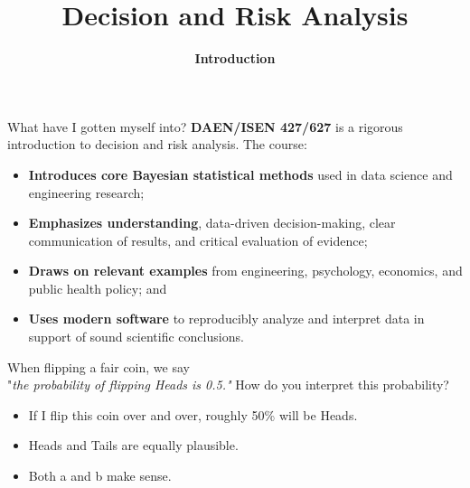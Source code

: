 \documentclass[12pt]{beamer}
\title{Decision and Risk Analysis}
\subtitle{\textbf{Introduction}}
\author{}
\date{
\color{aggiemaroon}{
DAEN 427 / ISEN 427 / ISEN 627 - Fall 2026\\
\textbf{Alexander Abuabara}
}
}
\newcommand{\vocab}[1]{\textcolor{AggieMaroon}{\textbf{#1}}}
\begin{document}
\maketitle

\begin{frame}{}
\begin{block}{What have I gotten myself into?}
\textbf{DAEN/ISEN 427/627} is a rigorous introduction to decision and risk analysis.
The course:
\begin{itemize}
    \item \vocab{Introduces core Bayesian statistical methods} used in data science and engineering research;
    \item \vocab{Emphasizes understanding}, data-driven decision-making, clear communication of results, and critical evaluation of evidence;
    \item \vocab{Draws on relevant examples} from engineering, psychology, economics, and public health policy; and
    \item \vocab{Uses modern software} to reproducibly analyze and interpret data in support of sound scientific conclusions.
\end{itemize}
\end{block}
\end{frame}

\begin{frame}{}
\begin{block}{When flipping a fair coin, we say\\
"\it{the probability of flipping Heads is 0.5.}"}
How do you interpret this probability?
\begin{itemize}
    \item If I flip this coin over and over, roughly 50\% will be Heads.
    \item Heads and Tails are equally plausible.
    \item Both a and b make sense.
\end{itemize}
\end{block}
\end{frame}
\end{document}
